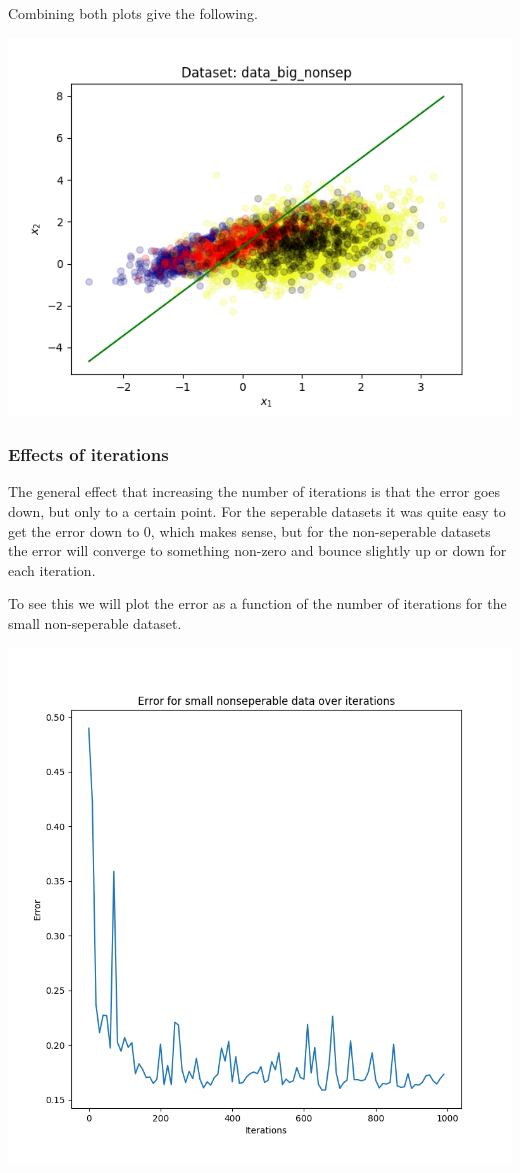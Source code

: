 \documentclass{article}
\begin{document}
Combining both plots give the following.

\begin{centering}
\includegraphics[width=0.9\linewidth]{ex4_scatter_both.png}
\end{centering}

\subsubsection{Effects of iterations}
The general effect that increasing the number of iterations is that the error goes down, but only to a certain point. For the seperable datasets it was quite easy to get the error down to 0, which makes sense, but for the non-seperable datasets the error will converge to something non-zero and bounce slightly up or down for each iteration. 

To see this we will plot the error as a function of the number of iterations for the small non-seperable dataset. 

\begin{centering}
\includegraphics[width=0.9\linewidth]{ex4_error_over_iterations_sgc.png}
\end{centering}
\end{document}
